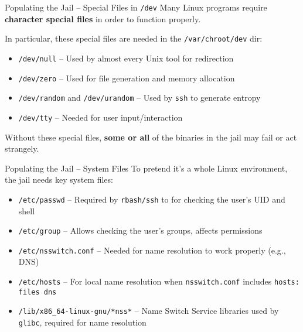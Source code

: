 \documentclass[14pt,compress,dvipsnames,aspectratio=169]{beamer} %
\begin{document}
\begin{frame}{Populating the Jail -- Special Files in \texttt{/dev}}
    Many Linux programs require \textbf{character special files} in order to function
    properly.

    In particular, these special files are needed in the \texttt{/var/chroot/dev} dir:
    \begin{itemize}
        \item{\texttt{/dev/null} -- Used by almost every Unix tool for redirection} 
        \item{\texttt{/dev/zero} -- Used for file generation and memory allocation} 
        \item{\texttt{/dev/random} and \texttt{/dev/urandom} -- Used by \texttt{ssh} to generate entropy } 
        \item{\texttt{/dev/tty} -- Needed for user input/interaction} 
    \end{itemize}
    \vspace{0.5em}
    Without these special files, \textbf{some or all} of the binaries in the jail may
    fail or act strangely.
\end{frame}

\begin{frame}{Populating the Jail -- System Files}
    To pretend it's a whole Linux environment, the jail needs key system files:
    \begin{itemize}
        \item{\texttt{/etc/passwd} -- Required by \texttt{rbash/ssh} to for checking the user's UID and shell} 
        \item{\texttt{/etc/group} -- Allows checking the user's groups, affects permissions} 
        \item{\texttt{/etc/nsswitch.conf} -- Needed for name resolution to work
            properly (e.g., DNS)} 
        \item{\texttt{/etc/hosts} -- For local name resolution when \texttt{nsswitch.conf} includes \texttt{hosts: files dns}} 
        \item{\texttt{/lib/x86\_64-linux-gnu/*nss*} -- Name Switch Service libraries
            used by \texttt{glibc}, required for name resolution} 
    \end{itemize}
    \vspace{0.5em}
\end{frame}
\end{document}
